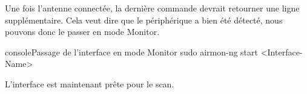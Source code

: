 Une fois l'antenne connectée, la dernière commande devrait retourner une ligne supplémentaire. 
Cela veut dire que le périphérique a bien été détecté, nous pouvons donc le passer en mode Monitor.

\begin{listingsbox}{console}{Passage de l'interface en mode Monitor}
sudo airmon-ng start <Interface-Name>
\end{listingsbox}

L'interface est maintenant prête pour le scan.
    


